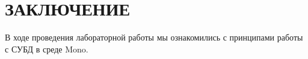 \section*{ЗАКЛЮЧЕНИЕ}

В ходе проведения лабораторной работы мы ознакомились 
с принципами работы с СУБД в среде Mono.

\newpage

